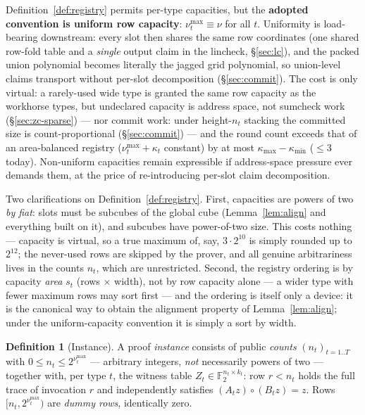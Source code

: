 \documentclass[11pt]{article}
\newcommand{\F}{\mathbb{F}}                       %
\newcommand{\Ftwo}{\F_2}
\theoremstyle{definition}
\newtheorem{definition}{Definition}
\begin{document}
Definition~\ref{def:registry} permits per-type capacities, but the
\textbf{adopted convention is uniform row capacity}:
$\nu_t^{\max} \equiv \nu$ for all $t$. Uniformity is load-bearing
downstream: every slot then shares the same row coordinates (one shared
row-fold table and a \emph{single} output claim in the lincheck,
\S\ref{sec:lc}), and the packed union polynomial becomes literally the
jagged grid polynomial, so union-level claims transport without per-slot
decomposition (\S\ref{sec:commit}). The cost is only virtual: a
rarely-used wide type is granted the same row capacity as the workhorse
types, but undeclared capacity is address space, not sumcheck work
(\S\ref{sec:zc-sparse}) --- nor commit work: under height-$n_t$ stacking
the committed size is count-proportional (\S\ref{sec:commit}) --- and the
round count exceeds that of an
area-balanced registry ($\nu_t^{\max} + \kappa_t$ constant) by at most
$\kappa_{\max} - \kappa_{\min}$ ($\le 3$ today). Non-uniform capacities
remain expressible if address-space pressure ever demands them, at the
price of re-introducing per-slot claim decomposition.

Two clarifications on Definition~\ref{def:registry}. First, capacities are
powers of two \emph{by fiat}: slots must be subcubes of the global cube
(Lemma~\ref{lem:align} and everything built on it), and subcubes have
power-of-two size. This costs nothing --- capacity is virtual, so a true
maximum of, say, $3 \cdot 2^{10}$ is simply rounded up to $2^{12}$; the
never-used rows are skipped by the prover, and all genuine arbitrariness
lives in the counts $n_t$, which are unrestricted. Second, the registry
ordering is by capacity \emph{area} $s_t$ (rows $\times$ width), not by row
capacity alone --- a wider type with fewer maximum rows may sort first ---
and the ordering is itself only a device: it is the canonical way to obtain
the alignment property of Lemma~\ref{lem:align}; under the
uniform-capacity convention it is simply a sort by width.

\begin{definition}[Instance]\label{def:instance}
A proof \emph{instance} consists of public \emph{counts}
$(n_t)_{t=1..T}$ with $0 \le n_t \le 2^{\nu_t^{\max}}$ --- arbitrary
integers, \emph{not} necessarily powers of two --- together with, per type
$t$, the witness table $Z_t \in \Ftwo^{n_t \times k_t}$: row $r < n_t$ holds
the full trace of invocation $r$ and independently satisfies
$(A_t z) \circ (B_t z) = z$. Rows $[n_t, 2^{\nu_t^{\max}})$ are \emph{dummy
rows}, identically zero.
\end{definition}
\end{document}

